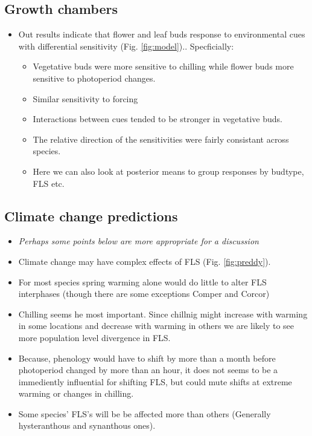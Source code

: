 \documentclass[11pt]{article}
\begin{document}
\subsection*{Growth chambers}
\begin{itemize}
\item Out results indicate that flower and leaf buds response to environmental cues with differential sensitivity (Fig. \ref{fig:model}).. Specficially:
\begin{itemize}
\item Vegetative buds were more sensitive to chilling while flower buds more sensitive to photoperiod changes.
\item Similar sensitivity to forcing
\item Interactions between cues tended to be stronger in vegetative buds.
\item The relative direction of the sensitivities were fairly consistant across species. 
\item Here we can also look at posterior means to group responses by budtype, FLS etc.
\end{itemize}
\end{itemize}
\subsection*{Climate change predictions}
\begin{itemize}
\item \textit{Perhaps some points below are more appropriate for a discussion}
\item Climate change may have complex effects of FLS (Fig. \ref{fig:preddy}).
\item For most species spring warming alone would do little to alter FLS interphases (though there are some exceptions Comper and Corcor)
\item Chilling seems he most important. Since chillnig might increase with warming in some locations and decrease with warming in others we are likely to see more population level divergence in FLS. 
\item Because, phenology would have to shift by more than a month before photoperiod changed by more than an hour, it does not seems to be a immediently influential for shifting FLS, but could mute shifts at extreme warming or changes in chilling.
\item Some species' FLS's will be be affected more than others (Generally hysteranthous and synanthous ones).
\end{itemize}
\end{document}
